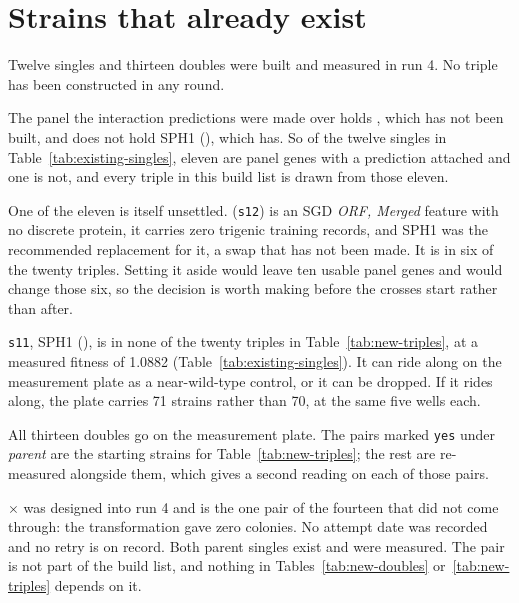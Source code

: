 
\section{Strains that already exist}\label{sec:exists}

Twelve singles and thirteen doubles were built and measured in run 4. No triple
has been constructed in any round.



The panel the interaction predictions were made over holds , which
has not been built, and does not hold SPH1 (), which has. So of the
twelve singles in Table~\ref{tab:existing-singles}, eleven are panel genes with a
prediction attached and one is not, and every triple in this build list is drawn
from those eleven.

One of the eleven is itself unsettled.  (\texttt{s12}) is an SGD
\emph{ORF, Merged} feature with no discrete protein, it carries zero trigenic
training records, and SPH1 was the recommended replacement for it, a swap that has
not been made. It is in six of the twenty triples. Setting it aside would leave ten
usable panel genes and would change those six, so the decision is worth making
before the crosses start rather than after.

\texttt{s11}, SPH1 (), is in none of the twenty triples in
Table~\ref{tab:new-triples}, at a measured fitness of 1.0882
(Table~\ref{tab:existing-singles}). It can ride along on the measurement plate as a
near-wild-type control, or it can be dropped. If it rides along, the plate carries
71 strains rather than 70, at the same five wells each.



All thirteen doubles go on the measurement plate. The pairs marked
\texttt{yes} under \emph{parent} are the starting strains for
Table~\ref{tab:new-triples}; the rest are re-measured alongside them, which gives
a second reading on each of those pairs.

 $\times$  was designed into run 4 and is the one
pair of the fourteen that did not come through: the transformation gave zero
colonies. No attempt date was recorded and no retry is on record. Both parent
singles exist and were measured. The pair is not part of the build list, and nothing in
Tables~\ref{tab:new-doubles} or~\ref{tab:new-triples} depends on it.
